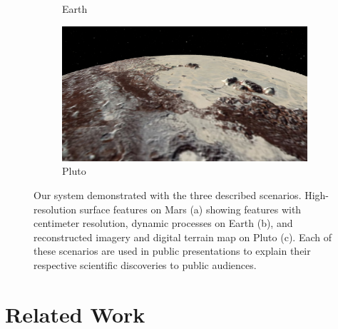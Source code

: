 \documentclass[journal]{vgtc}                %
\newcommand{\plgrem}[1]{\textcolor{blue}{~\textbf{!!}~}}
\begin{document}
\begin{figure}
\begin{subfigure}{0.33\linewidth}
      \caption{Earth}
    \end{subfigure}
    \begin{subfigure}{0.33\linewidth}
    	\includegraphics[width=\linewidth, height=0.6\linewidth]{figures/pluto.png}
      \caption{Pluto}
    \end{subfigure}
    \caption{Our system demonstrated with the three described scenarios. High-resolution surface features on Mars (a) showing features with centimeter resolution, dynamic processes on Earth (b), and reconstructed imagery and digital terrain map on Pluto (c). Each of these scenarios are used in public presentations to explain their respective scientific discoveries to public audiences.}\vspace{-3mm}
    \label{fig:scenarios}
\end{figure}


\section{Related Work} \label{sec:relatedwork}

%
\end{document}
